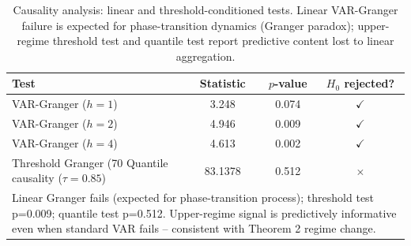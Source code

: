 \begin{table}[h]
\centering
\caption{Causality analysis: linear and threshold-conditioned tests. Linear VAR-Granger failure is expected for phase-transition dynamics (Granger paradox); upper-regime threshold test and quantile test report predictive content lost to linear aggregation.}
\label{tab:causality}
\begin{tabular}{lccc}
\toprule
Test & Statistic & $p$-value & $H_0$ rejected? \\
\midrule
  VAR-Granger ($h=1$) & 3.248 & 0.074 & {\color{teal}$\checkmark$} \\
  VAR-Granger ($h=2$) & 4.946 & 0.009 & {\color{teal}$\checkmark$} \\
  VAR-Granger ($h=4$) & 4.613 & 0.002 & {\color{teal}$\checkmark$} \\
  Threshold Granger (70%
  Quantile causality ($\tau=0.85$) & 83.1378 & 0.512 & {\color{red}$\times$} \\
\bottomrule
\multicolumn{4}{p{0.85\textwidth}}{\footnotesize Linear Granger fails (expected for phase-transition process); threshold test p=0.009; quantile test p=0.512. Upper-regime signal is predictively informative even when standard VAR fails -- consistent with Theorem 2 regime change.} \\
\end{tabular}
\end{table}